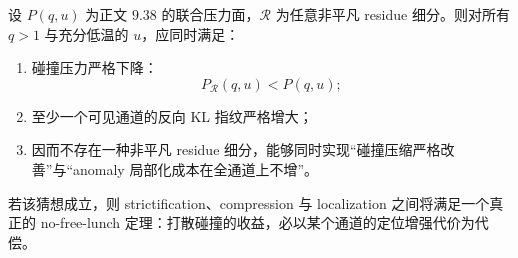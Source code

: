 \begin{conjecture}[残差细分与定位增强的二律背反]\label{conj:conclusion-residue-refinement-localization-tradeoff}
设 \(P(q,u)\) 为正文 \(9.38\) 的联合压力面，\(\mathcal R\) 为任意非平凡 residue 细分。则对所有 \(q>1\) 与充分低温的 \(u\)，应同时满足：
\begin{enumerate}
  \item 碰撞压力严格下降：
  \[
  P_{\mathcal R}(q,u)<P(q,u);
  \]
  \item 至少一个可见通道的反向 KL 指纹严格增大；
  \item 因而不存在一种非平凡 residue 细分，能够同时实现“碰撞压缩严格改善”与“anomaly 局部化成本在全通道上不增”。
\end{enumerate}
若该猜想成立，则 strictification、compression 与 localization 之间将满足一个真正的 no-free-lunch 定理：打散碰撞的收益，必以某个通道的定位增强代价为代偿。
\end{conjecture}
